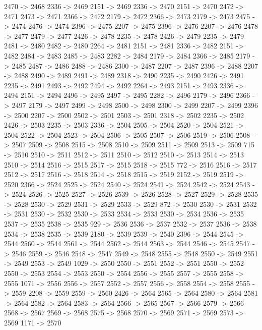 {	2470 -> 2468
	2336 -> 2469
	2151 -> 2469
	2336 -> 2470
	2151 -> 2470
	2472 -> 2471
	2473 -> 2471
	2366 -> 2472
	2179 -> 2472
	2366 -> 2473
	2179 -> 2473
	2475 -> 2474
	2476 -> 2474
	2396 -> 2475
	2207 -> 2475
	2396 -> 2476
	2207 -> 2476
	2478 -> 2477
	2479 -> 2477
	2426 -> 2478
	2235 -> 2478
	2426 -> 2479
	2235 -> 2479
	2481 -> 2480
	2482 -> 2480
	2264 -> 2481
	2151 -> 2481
	2336 -> 2482
	2151 -> 2482
	2484 -> 2483
	2485 -> 2483
	2282 -> 2484
	2179 -> 2484
	2366 -> 2485
	2179 -> 2485
	2487 -> 2486
	2488 -> 2486
	2300 -> 2487
	2207 -> 2487
	2396 -> 2488
	2207 -> 2488
	2490 -> 2489
	2491 -> 2489
	2318 -> 2490
	2235 -> 2490
	2426 -> 2491
	2235 -> 2491
	2493 -> 2492
	2494 -> 2492
	2264 -> 2493
	2151 -> 2493
	2336 -> 2494
	2151 -> 2494
	2496 -> 2495
	2497 -> 2495
	2282 -> 2496
	2179 -> 2496
	2366 -> 2497
	2179 -> 2497
	2499 -> 2498
	2500 -> 2498
	2300 -> 2499
	2207 -> 2499
	2396 -> 2500
	2207 -> 2500
	2502 -> 2501
	2503 -> 2501
	2318 -> 2502
	2235 -> 2502
	2426 -> 2503
	2235 -> 2503
	2336 -> 2504
	2505 -> 2504
	2520 -> 2504
	2521 -> 2504
	2522 -> 2504
	2523 -> 2504
	2506 -> 2505
	2507 -> 2506
	2519 -> 2506
	2508 -> 2507
	2509 -> 2508
	2515 -> 2508
	2510 -> 2509
	2511 -> 2509
	2513 -> 2509
	715 -> 2510
	2510 -> 2511
	2512 -> 2511
	2510 -> 2512
	2510 -> 2513
	2514 -> 2513
	2510 -> 2514
	2516 -> 2515
	2517 -> 2515
	2518 -> 2515
	772 -> 2516
	2516 -> 2517
	2512 -> 2517
	2516 -> 2518
	2514 -> 2518
	2515 -> 2519
	2152 -> 2519
	2519 -> 2520
	2366 -> 2524
	2525 -> 2524
	2540 -> 2524
	2541 -> 2524
	2542 -> 2524
	2543 -> 2524
	2526 -> 2525
	2527 -> 2526
	2539 -> 2526
	2528 -> 2527
	2529 -> 2528
	2535 -> 2528
	2530 -> 2529
	2531 -> 2529
	2533 -> 2529
	872 -> 2530
	2530 -> 2531
	2532 -> 2531
	2530 -> 2532
	2530 -> 2533
	2534 -> 2533
	2530 -> 2534
	2536 -> 2535
	2537 -> 2535
	2538 -> 2535
	929 -> 2536
	2536 -> 2537
	2532 -> 2537
	2536 -> 2538
	2534 -> 2538
	2535 -> 2539
	2180 -> 2539
	2539 -> 2540
	2396 -> 2544
	2545 -> 2544
	2560 -> 2544
	2561 -> 2544
	2562 -> 2544
	2563 -> 2544
	2546 -> 2545
	2547 -> 2546
	2559 -> 2546
	2548 -> 2547
	2549 -> 2548
	2555 -> 2548
	2550 -> 2549
	2551 -> 2549
	2553 -> 2549
	1029 -> 2550
	2550 -> 2551
	2552 -> 2551
	2550 -> 2552
	2550 -> 2553
	2554 -> 2553
	2550 -> 2554
	2556 -> 2555
	2557 -> 2555
	2558 -> 2555
	1071 -> 2556
	2556 -> 2557
	2552 -> 2557
	2556 -> 2558
	2554 -> 2558
	2555 -> 2559
	2208 -> 2559
	2559 -> 2560
	2426 -> 2564
	2565 -> 2564
	2580 -> 2564
	2581 -> 2564
	2582 -> 2564
	2583 -> 2564
	2566 -> 2565
	2567 -> 2566
	2579 -> 2566
	2568 -> 2567
	2569 -> 2568
	2575 -> 2568
	2570 -> 2569
	2571 -> 2569
	2573 -> 2569
	1171 -> 2570
}
